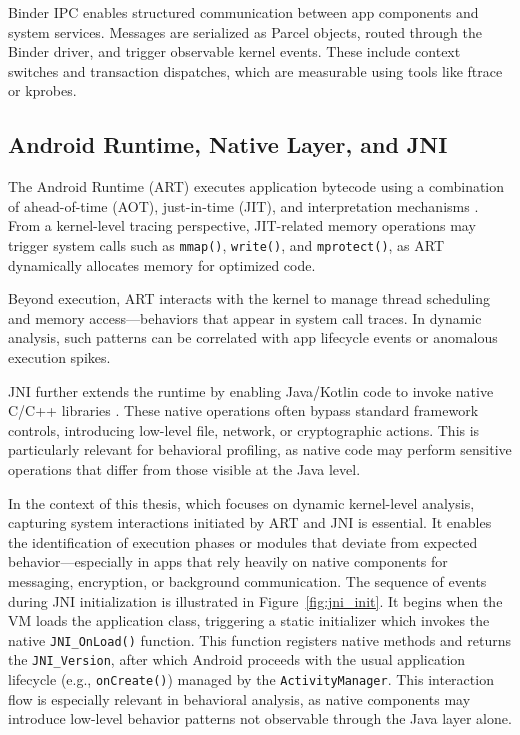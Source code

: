 \documentclass[a4paper,12pt]{report}
\begin{document}
Binder IPC enables structured communication between app components and system services. Messages are serialized as Parcel objects, routed through the Binder driver, and trigger observable kernel events. These include context switches and transaction dispatches, which are measurable using tools like ftrace or kprobes.

\subsection{Android Runtime, Native Layer, and JNI}
The Android Runtime (ART) executes application bytecode using a combination of ahead-of-time (AOT), just-in-time (JIT), and interpretation mechanisms \cite{AOSPART}. From a kernel-level tracing perspective, JIT-related memory operations may trigger system calls such as \texttt{mmap()}, \texttt{write()}, and \texttt{mprotect()}, as ART dynamically allocates memory for optimized code.

Beyond execution, ART interacts with the kernel to manage thread scheduling and memory access—behaviors that appear in system call traces. In dynamic analysis, such patterns can be correlated with app lifecycle events or anomalous execution spikes.

JNI further extends the runtime by enabling Java/Kotlin code to invoke native C/C++ libraries \cite{AOSPJNI}. These native operations often bypass standard framework controls, introducing low-level file, network, or cryptographic actions. This is particularly relevant for behavioral profiling, as native code may perform sensitive operations that differ from those visible at the Java level.

In the context of this thesis, which focuses on dynamic kernel-level analysis, capturing system interactions initiated by ART and JNI is essential. It enables the identification of execution phases or modules that deviate from expected behavior—especially in apps that rely heavily on native components for messaging, encryption, or background communication. The sequence of events during JNI initialization is illustrated in Figure~\ref{fig:jni_init}. It begins when the VM loads the application class, triggering a static initializer which invokes the native \texttt{JNI\_OnLoad()} function. This function registers native methods and returns the \texttt{JNI\_Version}, after which Android proceeds with the usual application lifecycle (e.g., \texttt{onCreate()}) managed by the \texttt{ActivityManager}. This interaction flow is especially relevant in behavioral analysis, as native components may introduce low-level behavior patterns not observable through the Java layer alone.
\end{document}
